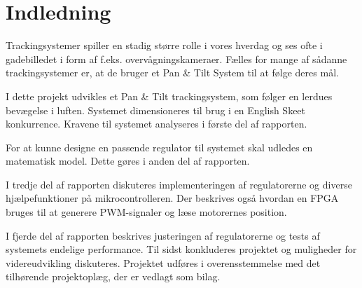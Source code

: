 \section*{Indledning}
Trackingsystemer spiller en stadig større rolle i vores hverdag og ses ofte i gadebilledet i form 
af f.eks. overvågningskameraer.
Fælles for mange af sådanne trackingsystemer er, at de bruger et Pan \& Tilt System til at følge deres mål. 

I dette projekt udvikles et Pan \& Tilt trackingsystem, som følger en lerdues bevægelse i 
luften. Systemet dimensioneres til brug i en English Skeet konkurrence. Kravene til systemet analyseres i første del af rapporten. 

For at kunne designe en passende regulator til systemet skal udledes en matematisk model. Dette gøres i anden del af rapporten. 

I tredje del af rapporten diskuteres implementeringen af regulatorerne og diverse hjælpefunktioner på mikrocontrolleren. Der beskrives også hvordan en FPGA bruges til at generere PWM-signaler og læse motorernes position. 

I fjerde del af rapporten beskrives justeringen af regulatorerne og tests af systemets endelige performance.
Til sidst konkluderes projektet og muligheder for videreudvikling diskuteres.
Projektet udføres i overensstemmelse med det tilhørende projektoplæg, der er vedlagt 
som bilag.